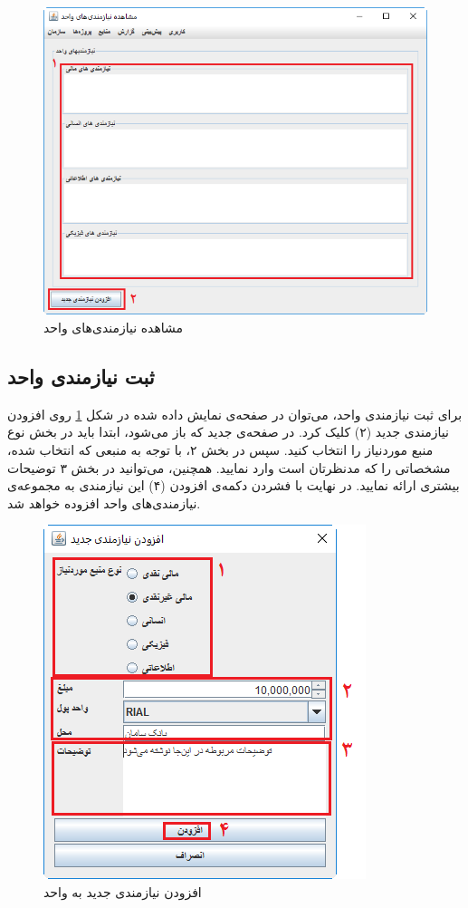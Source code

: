 	\begin{figure}[H]
		\centering
		\includegraphics[scale=0.6]{img/manual/viewUnitReqs}
		\caption{مشاهده نیازمندی‌های واحد}
		\label{f101}		
	\end{figure}

\subsection{ثبت نیازمندی واحد}
برای ثبت نیازمندی واحد، می‌توان در صفحه‌ی نمایش داده شده در شکل
\ref{f101}
روی افزودن نیازمندی جدید (۲) کلیک کرد. در صفحه‌ی جدید که باز می‌شود، ابتدا باید در بخش نوع منبع موردنیاز را انتخاب کنید. سپس در بخش ۲، با توجه به منبعی که انتخاب شده، مشخصاتی را که مدنظرتان است وارد نمایید. همچنین، می‌توانید در بخش ۳ توضیحات بیشتری ارائه نمایید. در نهایت با فشردن دکمه‌ی افزودن (۴)  این نیازمندی به مجموعه‌ی نیازمندی‌های واحد افزوده خواهد شد.

	\begin{figure}[H]
		\centering
		\includegraphics[scale=0.8]{img/manual/addReqToUnit}
		\caption{افزودن نیازمندی جدید به واحد}
	\end{figure}

